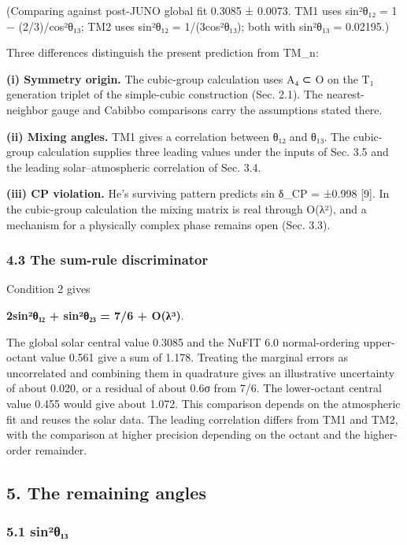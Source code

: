 \documentclass[
]{article}
\begin{document}
(Comparing against post-JUNO global fit 0.3085 ± 0.0073. TM1 uses
sin²θ₁₂ = 1 − (2/3)/cos²θ₁₃; TM2 uses sin²θ₁₂ = 1/(3cos²θ₁₃); both with
sin²θ₁₃ = 0.02195.)

Three differences distinguish the present prediction from TM\_n:

\textbf{(i) Symmetry origin.} The cubic-group calculation uses A₄ ⊂ O on
the T₁ generation triplet of the simple-cubic construction (Sec. 2.1).
The nearest-neighbor gauge and Cabibbo comparisons carry the assumptions
stated there.

\textbf{(ii) Mixing angles.} TM1 gives a correlation between θ₁₂ and
θ₁₃. The cubic-group calculation supplies three leading values under the
inputs of Sec. 3.5 and the leading solar--atmospheric correlation of
Sec. 3.4.

\textbf{(iii) CP violation.} He's surviving pattern predicts sin δ\_CP =
±0.998 {[}9{]}. In the cubic-group calculation the mixing matrix is real
through O(λ²), and a mechanism for a physically complex phase remains
open (Sec. 3.3).

\hypertarget{the-sum-rule-discriminator}{%
\subsubsection{4.3 The sum-rule
discriminator}\label{the-sum-rule-discriminator}}

Condition 2 gives

\textbf{2sin²θ₁₂ + sin²θ₂₃ = 7/6 + O(λ³)}.

The global solar central value 0.3085 and the NuFIT 6.0 normal-ordering
upper-octant value 0.561 give a sum of 1.178. Treating the marginal
errors as uncorrelated and combining them in quadrature gives an
illustrative uncertainty of about 0.020, or a residual of about 0.6σ
from 7/6. The lower-octant central value 0.455 would give about 1.072.
This comparison depends on the atmospheric fit and reuses the solar
data. The leading correlation differs from TM1 and TM2, with the
comparison at higher precision depending on the octant and the
higher-order remainder.

\hypertarget{the-remaining-angles}{%
\subsection{5. The remaining angles}\label{the-remaining-angles}}

\hypertarget{sinuxb2ux3b8ux2081ux2083}{%
\subsubsection{5.1 sin²θ₁₃}\label{sinuxb2ux3b8ux2081ux2083}}
\end{document}
